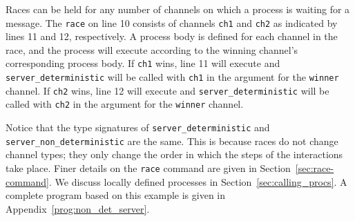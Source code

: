 \documentclass[11pt]{article}
\begin{document}
Races can be held for any number of channels on which a process is waiting for a message.
The \lstinline$race$ on line 10 consists of channels \lstinline$ch1$ and \lstinline$ch2$ as indicated by lines 11 and 12, respectively.
A process body is defined for each channel in the race, and the process will execute according to the winning channel's corresponding process body.
If \lstinline$ch1$ wins, line 11 will execute and \lstinline$server_deterministic$ will be called with \lstinline$ch1$ in the argument for the  \lstinline$winner$ channel.
If \lstinline$ch2$ wins, line 12 will execute and \lstinline$server_deterministic$ will be called with \lstinline$ch2$ in the argument for the \lstinline$winner$ channel.

Notice that the type signatures of \lstinline$server_deterministic$ and \lstinline$server_non_deterministic$ are the same. 
This is because races do not change channel types; they only change the order in which the steps of the interactions take place.
Finer details on the \lstinline$race$ command are given in Section~\ref{sec:race-command}.
We discuss locally defined processes in Section~\ref{sec:calling_procs}.
A complete program based on this example is given in Appendix~\ref{prog:non_det_server}.
\end{document}
